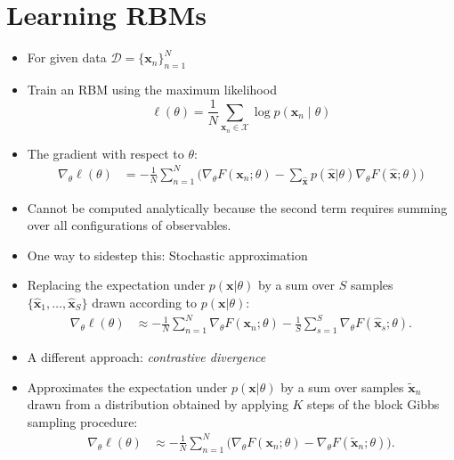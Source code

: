 \documentclass{antclass}
\begin{document}
\section{Learning RBMs}
\begin{itemize}
	\item For given data \(\mathcal{D}=\{\mathbf{x}_n\}_{n=1}^N\) \item Train an RBM using the maximum likelihood
	\begin{equation}
		\ell(\theta) = \frac{1}{N} \sum_{\mathbf{x}_n \in \mathcal{X}} \log p(\mathbf{x}_n \mid \theta)
	\end{equation}
	\item The gradient with respect to \(\theta\):
\begin{align}
	\nabla_\theta \ell(\theta) &= -\frac{1}{N} \sum_{n=1}^N \big( \nabla_\theta F(\mathbf{x}_n; \theta) - \sum_{\mathbf{\hat{x}}} p(\mathbf{\hat{x}}|\theta) \nabla_\theta F(\mathbf{\hat{x}}; \theta) \big)
\end{align}
	\item Cannot be computed analytically because the second term requires summing over all configurations of observables.

\end{itemize}
\pagebreak

\begin{itemize}
	\item One way to sidestep this: Stochastic approximation
	\item  Replacing the expectation under \( p(\mathbf{x}|\theta) \) by a sum over \( S \) samples \(\{\mathbf{\hat{x}}_1, \ldots, \mathbf{\hat{x}}_S\}\) drawn according to \( p(\mathbf{x}|\theta) \):
	\begin{align}
		\nabla_\theta \ell(\theta) &\approx -\frac{1}{N} \sum_{n=1}^N \nabla_\theta F(\mathbf{x}_n; \theta) - \frac{1}{S} \sum_{s=1}^S \nabla_\theta F(\mathbf{\hat{x}}_s; \theta).
	\end{align}
\end{itemize}

\pagebreak
\begin{itemize}
	\item A different approach: \emph{contrastive divergence}
	\item Approximates the expectation under \( p(\mathbf{x}|\theta) \) by a sum over samples \(\mathbf{\tilde{x}}_n\) drawn from a distribution obtained by applying \( K \) steps of the block Gibbs sampling procedure:
	\begin{align}
		\nabla_\theta \ell(\theta) &\approx -\frac{1}{N} \sum_{n=1}^N \big( \nabla_\theta F(\mathbf{x}_n; \theta) - \nabla_\theta F(\mathbf{\tilde{x}}_n; \theta) \big). 
	\end{align}
	 
\end{itemize}
\end{document}
